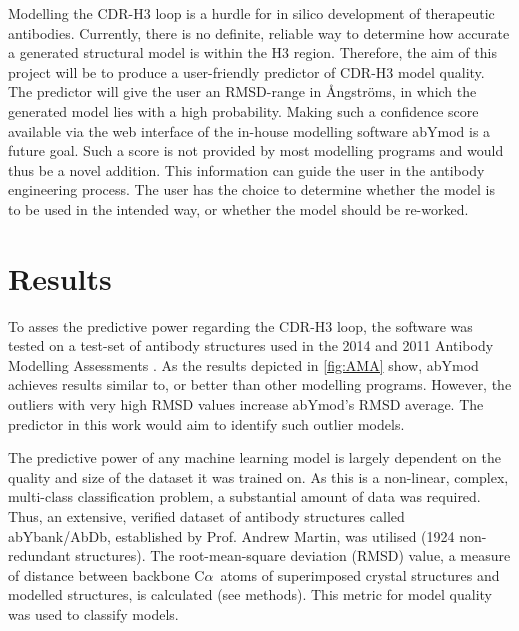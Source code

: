 \documentclass[12pt]{article}
\newcommand{\ca}{\mbox{C$\alpha$}}
\begin{document}
Modelling the CDR-H3 loop is a hurdle for in silico development of
therapeutic antibodies. Currently, there is no definite, reliable way
to determine how accurate a generated structural model is within the
H3 region. Therefore, the aim of this project will be to produce a
user-friendly predictor of CDR-H3 model quality. The predictor will give
the user an RMSD-range in {\AA}ngstr\"{o}ms, in which the generated model lies
with a high probability. Making such a confidence score available via
the web interface of the in-house modelling software abYmod is a
future goal. Such a score is not provided by most modelling programs
and would thus be a novel addition.  This information can guide the
user in the antibody engineering process. The user has the choice to
determine whether the model is to be used in the intended way, or
whether the model should be re-worked.

\section{Results}
To asses the predictive power regarding the CDR-H3 loop, the software
was tested on a test-set of antibody structures used in the 2014 and
2011 Antibody Modelling Assessments
\cite{Almagro2011,Almagro2014}. As the results depicted in
\ref{fig:AMA} show, abYmod achieves results similar to, or better than
other modelling programs. However, the outliers with very high RMSD
values increase abYmod's RMSD average. The predictor in this work
would aim to identify such outlier models.

The predictive power of any machine learning model is largely
dependent on the quality and size of the dataset it was trained on. As
this is a non-linear, complex, multi-class classification problem, a
substantial amount of data was required. Thus, an extensive, verified
dataset of antibody structures called abYbank/AbDb\cite{XXXX},
established by Prof. Andrew Martin, was utilised (1924 non-redundant
structures). The root-mean-square deviation (RMSD) value, a measure of
distance between backbone \ca\ atoms of superimposed crystal structures
and modelled structures, is calculated (see methods). This metric for
model quality was used to classify models.
\end{document}
